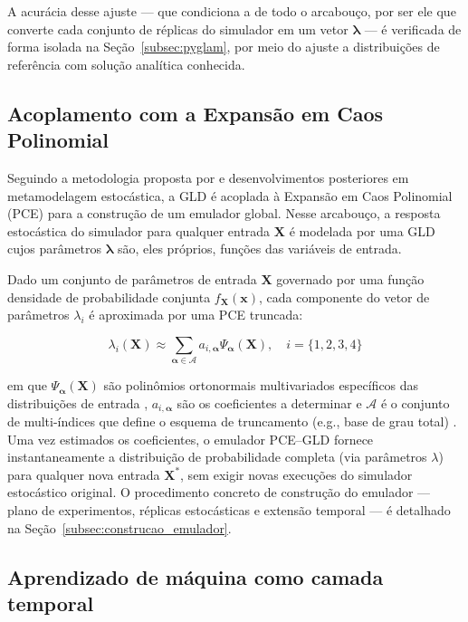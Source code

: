 A acurácia desse ajuste --- que condiciona a de todo o arcabouço, por ser ele que converte cada conjunto de réplicas do simulador em um vetor $\boldsymbol{\lambda}$ --- é verificada de forma isolada na Seção~\ref{subsec:pyglam}, por meio do ajuste a distribuições de referência com solução analítica conhecida.

\subsection{Acoplamento com a Expans\~ao em Caos Polinomial}
\label{subsec:pce}

Seguindo a metodologia proposta por \textcite{ZhuSudret2021} e desenvolvimentos posteriores em metamodelagem estocástica, a GLD é acoplada à Expansão em Caos Polinomial (PCE) para a construção de um emulador global. Nesse arcabouço, a resposta estocástica do simulador para qualquer entrada $\mathbf{X}$ é modelada por uma GLD cujos parâmetros $\boldsymbol{\lambda}$ são, eles próprios, funções das variáveis de entrada.

Dado um conjunto de parâmetros de entrada $\mathbf{X}$ governado por uma função densidade de probabilidade conjunta $f_{\mathbf{X}}(\mathbf{x})$, cada componente do vetor de parâmetros $\lambda_i$ é aproximada por uma PCE truncada:

\begin{equation}
\lambda_i(\mathbf{X}) \approx \sum_{\boldsymbol{\alpha} \in \mathcal{A}} a_{i, \boldsymbol{\alpha}} \Psi_{\boldsymbol{\alpha}}(\mathbf{X}), \quad i = \{1, 2, 3, 4\}
\label{eq:pce_lambda}
\end{equation}

\noindent em que $\Psi_{\boldsymbol{\alpha}}(\mathbf{X})$ são polinômios ortonormais multivariados específicos das distribuições de entrada \parencite{xiu2002}, $a_{i, \boldsymbol{\alpha}}$ são os coeficientes a determinar e $\mathcal{A}$ é o conjunto de multi-índices que define o esquema de truncamento (e.g., base de grau total) \parencite{blatman2011}. Uma vez estimados os coeficientes, o emulador PCE--GLD fornece instantaneamente a distribuição de probabilidade completa (via parâmetros $\lambda$) para qualquer nova entrada $\mathbf{X}^*$, sem exigir novas execuções do simulador estocástico original. O procedimento concreto de construção do emulador --- plano de experimentos, réplicas estocásticas e extensão temporal --- é detalhado na Seção~\ref{subsec:construcao_emulador}.

\subsection{Aprendizado de m\'aquina como camada temporal}\label{sec:ml}


